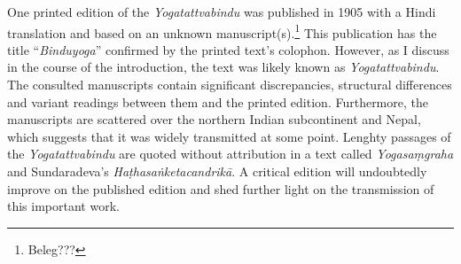 One printed edition of the \textit{Yogatattvabindu} was published in 1905 with a Hindi translation and based on an unknown manuscript(s).\footnote{Beleg???} This publication has the title ``\textit{Binduyoga}'' confirmed by the printed text’s colophon. However, as I discuss in the course of the introduction, the text was likely known as \textit{Yogatattvabindu}. The consulted manuscripts contain significant discrepancies, structural differences and variant readings between them and the printed edition. Furthermore, the manuscripts are scattered over the northern Indian subcontinent and Nepal, which suggests that it was widely transmitted at some point. Lenghty passages of the \textit{Yogatattvabindu} are quoted without attribution in a text called \textit{Yogasaṃgraha} and Sundaradeva’s \textit{Haṭhasaṅketacandrikā}. A critical edition will undoubtedly improve on the published edition and shed further light on the transmission of this important work.

